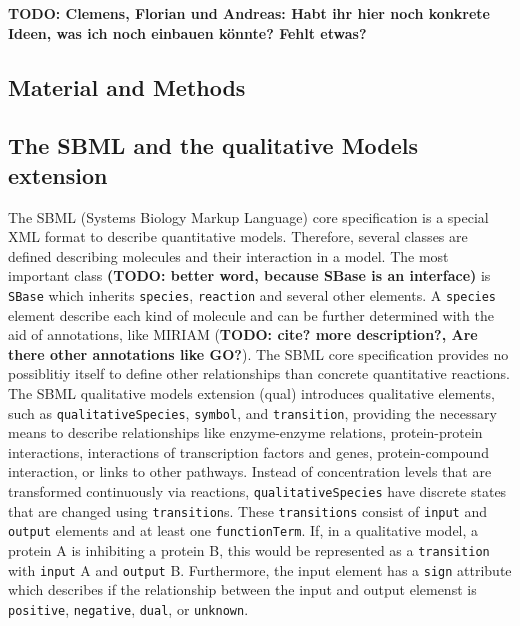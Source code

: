 \documentclass{bioinfo}
\begin{document}
\textbf{TODO: Clemens, Florian und Andreas: Habt ihr hier noch konkrete Ideen, was ich noch einbauen k\"onnte? Fehlt etwas?}


\begin{methods}
\section{Material and Methods}
\subsection{The SBML and the qualitative Models extension}
The SBML (Systems Biology Markup Language) core specification is a special XML format to describe quantitative models. Therefore, several classes are defined describing molecules and their interaction in a model. The most important class \textbf{(TODO: better word, because SBase is an interface)} is \texttt{SBase} which inherits \texttt{species}, \texttt{reaction} and several other elements. A \texttt{species} element describe each kind of molecule and can be further determined with the aid of annotations, like MIRIAM (\textbf{TODO: cite? more description?, Are there other annotations like GO?}). The SBML core specification provides no possiblitiy itself to define other relationships than concrete quantitative reactions. \citep{Hucka2003}\\
The SBML qualitative models extension (qual) introduces qualitative elements, such as \texttt{qualitativeSpecies}, \texttt{symbol}, and \texttt{transition}, providing the necessary means to describe relationships like enzyme-enzyme relations, protein-protein interactions, interactions of transcription factors and genes, protein-compound interaction, or links to other pathways.
Instead of concentration levels that are transformed continuously via reactions, \texttt{qualitativeSpecies} have discrete states that are changed using \texttt{transition}s.
These \texttt{transitions} consist of \texttt{input} and \texttt{output} elements and at least one \texttt{functionTerm}.
If, in a qualitative model, a protein A is inhibiting a protein B, this would be represented as a \texttt{transition} with \texttt{input} A and \texttt{output} B.
Furthermore, the input element has a \texttt{sign} attribute which describes if the relationship between the input and output elemenst is \texttt{positive}, \texttt{negative}, \texttt{dual}, or \texttt{unknown}.


\end{methods}
\end{document}
